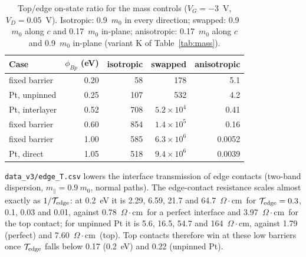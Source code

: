 \documentclass[11pt]{article}
\providecommand{\ohmcm}{\ensuremath{\Omega\cdot\mathrm{cm}}}
\providecommand{\ohmcm}{\ensuremath{\Omega\cdot\mathrm{cm}}}
\begin{document}
\begin{table}[!htbp]
\centering
\caption{Top/edge on-state ratio for the mass controls ($V_G=-3$~V, $V_D=0.05$~V). Isotropic: 0.9~$m_0$ in every direction; swapped: 0.9~$m_0$ along $c$ and 0.17~$m_0$ in-plane; anisotropic: 0.17~$m_0$ along $c$ and 0.9~$m_0$ in-plane (variant K of Table~\ref{tab:mass}).}
\label{tab:controls}\small
\begin{tabular}{lrrrr}
\toprule
Case & $\phi_{Bp}$ (eV) & isotropic & swapped & anisotropic \\
\midrule
fixed barrier & 0.20 & 58 & 178 & 5.1 \\
Pt, unpinned & 0.25 & 107 & 532 & 4.2 \\
Pt, interlayer & 0.52 & 708 & $5.2\times10^4$ & 0.41 \\
fixed barrier & 0.60 & 854 & $1.4\times10^5$ & 0.16 \\
fixed barrier & 1.00 & 585 & $6.3\times10^6$ & 0.0052 \\
Pt, direct & 1.05 & 518 & $9.4\times10^6$ & 0.0039 \\
\bottomrule
\end{tabular}
\end{table}

\texttt{data\_v3/edge\_T.csv} lowers the interface transmission of edge contacts (two-band dispersion, $m_\parallel=0.9~m_0$, normal paths). The edge-contact resistance scales almost exactly as $1/\mathcal{T}_{\rm edge}$: at 0.2~eV it is 2.29, 6.59, 21.7 and 64.7~\ohmcm\ for $\mathcal{T}_{\rm edge}=0.3$, 0.1, 0.03 and 0.01, against 0.78~\ohmcm\ for a perfect interface and 3.97~\ohmcm\ for the top contact; for unpinned Pt it is 5.6, 16.5, 54.7 and 164~\ohmcm, against 1.79 (perfect) and 7.60~\ohmcm\ (top). Top contacts therefore win at these low barriers once $\mathcal{T}_{\rm edge}$ falls below 0.17 (0.2~eV) and 0.22 (unpinned Pt).
\end{document}
